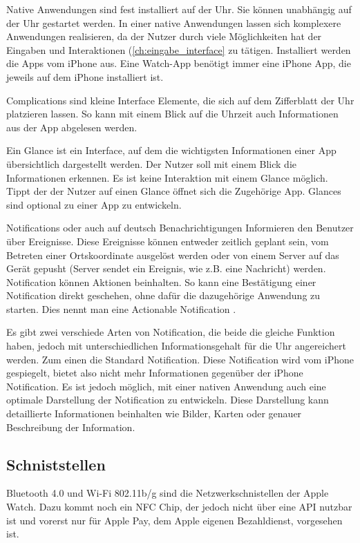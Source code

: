 Native Anwendungen sind fest installiert auf der Uhr. Sie können unabhängig auf der Uhr gestartet werden. In einer native Anwendungen lassen sich komplexere Anwendungen realisieren, da der Nutzer durch viele Möglichkeiten hat der Eingaben und Interaktionen (\ref{ch:eingabe_interface} zu tätigen. Installiert werden die Apps vom iPhone aus. Eine Watch-App benötigt immer eine iPhone App, die jeweils auf dem iPhone installiert ist.

Complications sind kleine Interface Elemente, die sich auf dem Zifferblatt der Uhr platzieren lassen. So kann mit einem Blick auf die Uhrzeit auch Informationen aus der App abgelesen werden.

Ein Glance ist ein Interface, auf dem die wichtigsten Informationen einer App übersichtlich dargestellt werden. Der Nutzer soll mit einem Blick die Informationen erkennen. Es ist keine Interaktion mit einem Glance möglich. Tippt der der Nutzer auf einen Glance öffnet sich die Zugehörige App. Glances sind optional zu einer App zu entwickeln.

Notifications oder auch auf deutsch Benachrichtigungen Informieren den Benutzer über Ereignisse. Diese Ereignisse können entweder zeitlich geplant sein, vom Betreten einer Ortskoordinate ausgelöst werden oder von einem Server auf das Gerät gepusht (Server sendet ein Ereignis, wie z.B. eine Nachricht) werden. Notification können Aktionen beinhalten. So kann eine Bestätigung einer Notification direkt geschehen, ohne dafür die dazugehörige Anwendung zu starten. Dies nennt man eine Actionable Notification \cite{Apple:2015devAw}.

Es gibt zwei verschiede Arten von Notification, die beide die gleiche Funktion haben, jedoch mit unterschiedlichen Informationsgehalt für die Uhr angereichert werden. Zum einen die Standard Notification. Diese Notification wird vom iPhone gespiegelt, bietet also nicht mehr Informationen gegenüber der iPhone Notification. Es ist jedoch möglich, mit einer nativen Anwendung auch eine optimale Darstellung der Notification zu entwickeln. Diese Darstellung kann detaillierte Informationen beinhalten wie Bilder, Karten oder genauer Beschreibung der Information\cite{Apple:2015notif}.

\subsection{Schniststellen}
Bluetooth 4.0 und Wi-Fi 802.11b/g sind die Netzwerkschnistellen der Apple Watch. Dazu kommt noch ein NFC Chip, der jedoch nicht über eine API nutzbar ist und vorerst nur für Apple Pay, dem Apple eigenen Bezahldienst, vorgesehen ist\cite{RITCHIE:2015aa}. 
